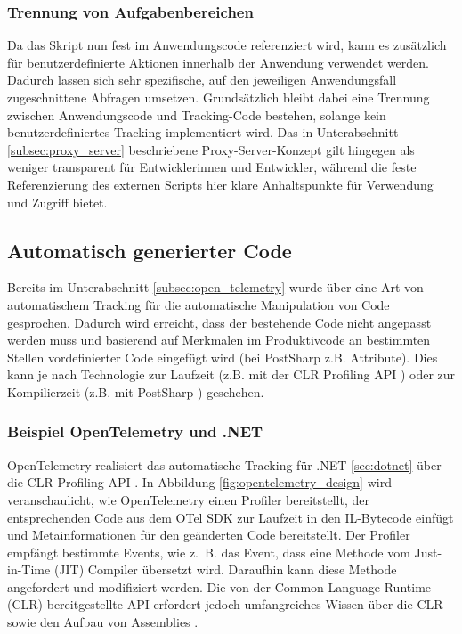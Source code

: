 \subsubsection{Trennung von Aufgabenbereichen}
Da das Skript nun fest im Anwendungscode referenziert wird, kann es zusätzlich für benutzerdefinierte Aktionen innerhalb der Anwendung verwendet werden. Dadurch lassen sich sehr spezifische, auf den jeweiligen Anwendungsfall zugeschnittene Abfragen umsetzen. Grundsätzlich bleibt dabei eine Trennung zwischen Anwendungscode und Tracking-Code bestehen, solange kein benutzerdefiniertes Tracking implementiert wird.  
Das in Unterabschnitt \ref{subsec:proxy_server} beschriebene Proxy-Server-Konzept gilt hingegen als weniger transparent für Entwicklerinnen und Entwickler, während die feste Referenzierung des externen Scripts hier klare Anhaltspunkte für Verwendung und Zugriff bietet.

\subsection{Automatisch generierter Code}
\label{subsec:autogenerated_code}
Bereits im Unterabschnitt \ref{subsec:open_telemetry} wurde über eine Art von automatischem Tracking für die automatische Manipulation von Code gesprochen. Dadurch wird erreicht, dass der bestehende Code nicht angepasst werden muss und basierend auf Merkmalen im Produktivcode an bestimmten Stellen vordefinierter Code eingefügt wird (bei PostSharp z.B. Attribute). Dies kann je nach Technologie zur Laufzeit (z.B. mit der CLR Profiling API \cite{microsoft2025profiling}) oder zur Kompilierzeit (z.B. mit PostSharp \cite{postsharp-how-it-works}) geschehen.

\subsubsection{Beispiel OpenTelemetry und .NET}
OpenTelemetry realisiert das automatische Tracking für .NET \ref{sec:dotnet} über die CLR Profiling API \cite{microsoft2025profiling}. In Abbildung \ref{fig:opentelemetry_design} wird veranschaulicht, wie OpenTelemetry einen Profiler bereitstellt, der entsprechenden Code aus dem OTel SDK zur Laufzeit in den IL-Bytecode einfügt und Metainformationen für den geänderten Code bereitstellt. Der Profiler empfängt bestimmte Events, wie z.~B. das Event, dass eine Methode vom Just-in-Time (JIT) Compiler übersetzt wird. Daraufhin kann diese Methode angefordert und modifiziert werden. Die von der Common Language Runtime (CLR) bereitgestellte API erfordert jedoch umfangreiches Wissen über die CLR sowie den Aufbau von Assemblies \cite{Mikunov2003}.

